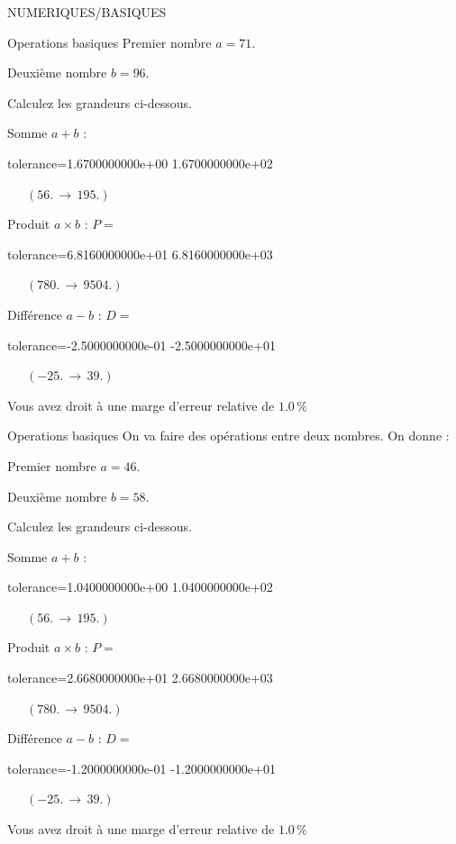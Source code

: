 \documentclass[12pt]{article}
\begin{document}
\begin{quiz}{NUMERIQUES/BASIQUES}
\begin{cloze}{Operations basiques}
Premier nombre $a = 71.\, $

Deuxième nombre $b = 96.\, $

 

Calculez les grandeurs ci-dessous.

Somme $ a + b $ : 
\begin{numerical}[points=1] 
\item[tolerance={1.6700000000e+00}] 1.6700000000e+02 
\end{numerical} 
 $\,$ 
 $ \quad (56. \, \rightarrow \, 195.) $ 

Produit $ a \times b $ : $P =  $
\begin{numerical}[points=1] 
\item[tolerance={6.8160000000e+01}] 6.8160000000e+03 
\end{numerical} 
 $\,$ 
 $ \quad (780. \, \rightarrow \, 9504.) $ 

Différence $ a - b $ : $D =  $
\begin{numerical}[points=1] 
\item[tolerance={-2.5000000000e-01}] -2.5000000000e+01 
\end{numerical} 
 $\,$ 
 $ \quad (-25. \, \rightarrow \, 39.) $ 

Vous avez droit à une marge d'erreur relative de $1.0\, \% $

\end{cloze} 


 \begin{cloze}{Operations basiques} 
On va faire des opérations entre deux nombres. On donne :

Premier nombre $a = 46.\, $

Deuxième nombre $b = 58.\, $

 

Calculez les grandeurs ci-dessous.

Somme $ a + b $ : 
\begin{numerical}[points=1] 
\item[tolerance={1.0400000000e+00}] 1.0400000000e+02 
\end{numerical} 
 $\,$ 
 $ \quad (56. \, \rightarrow \, 195.) $ 

Produit $ a \times b $ : $P =  $
\begin{numerical}[points=1] 
\item[tolerance={2.6680000000e+01}] 2.6680000000e+03 
\end{numerical} 
 $\,$ 
 $ \quad (780. \, \rightarrow \, 9504.) $ 

Différence $ a - b $ : $D =  $
\begin{numerical}[points=1] 
\item[tolerance={-1.2000000000e-01}] -1.2000000000e+01 
\end{numerical} 
 $\,$ 
 $ \quad (-25. \, \rightarrow \, 39.) $ 

Vous avez droit à une marge d'erreur relative de $1.0\, \% $

\end{cloze} 


\end{quiz}
\end{document}
